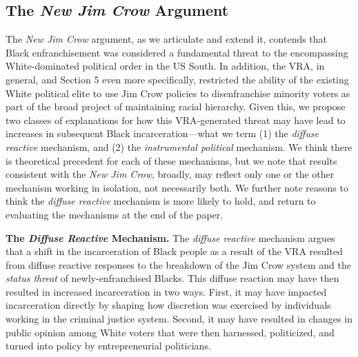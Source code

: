 \documentclass[12pt]{article}
\begin{document}
\subsection*{The \emph{New Jim Crow} Argument}

The \emph{New Jim Crow} argument, as we articulate and extend it, contends that Black enfranchisement was considered a fundamental threat to the encompassing White-dominated political order in the US South.  In addition, the VRA, in general, and Section 5 even more specifically, restricted the ability of the existing White political elite to use Jim Crow policies to disenfranchise minority voters as part of the broad project of maintaining racial hierarchy. Given this, we propose two classes of explanations for how this VRA-generated threat may have lead to increases in subsequent Black incarceration---what we term (1) the \emph{diffuse reactive} mechanism, and (2) the \emph{instrumental political} mechanism.  We think there is theoretical precedent for each of these mechanisms, but we note that results consistent with the \emph{New Jim Crow}, broadly, may reflect only one or the other mechanism working in isolation, not necessarily both.  We further note reasons to think the \emph{diffuse reactive} mechanism is more likely to hold, and return to evaluating the mechanisms at the end of the paper.



\vspace{.12in}
\textbf{The \emph{Diffuse Reactive} Mechanism.} \text{  } The \emph{diffuse reactive} mechanism argues that a shift in the incarceration of Black people as a result of the VRA resulted from diffuse reactive responses to the breakdown of the Jim Crow system and the \emph{status threat} of newly-enfranchised Blacks. This diffuse reaction may have then resulted in increased incarceration in two ways. First, it may have impacted incarceration directly by shaping how discretion was exercised by individuals working in the criminal justice system. Second, it may have resulted in changes in public opinion among White voters that were then harnessed, politicized, and turned into policy by entrepreneurial politicians.
\end{document}
